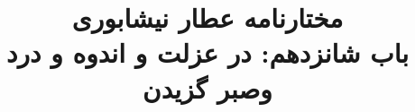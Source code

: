\documentclass[14pt,b5paper]{article}
\begin{document}
\title{\Huge مختارنامه عطار نیشابوری \\
باب شانزدهم: در عزلت و اندوه و درد وصبر گزیدن}
\author{ }
\date{ }
\maketitle
\newpage
\tableofcontents
\newpage

\newpage

\newpage

\newpage

\newpage

\newpage

\newpage

\newpage

\newpage

\newpage

\newpage

\newpage

\newpage

\newpage

\newpage

\newpage

\newpage

\newpage

\newpage

\newpage

\newpage

\newpage
\end{document}
